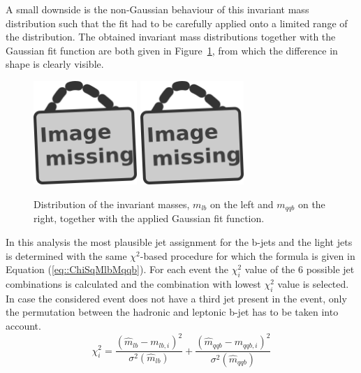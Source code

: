 A small downside is the non-Gaussian behaviour of this invariant mass distribution such that the fit had to be carefully applied onto a limited range of the distribution.
The obtained invariant mass distributions together with the Gaussian fit function are both given in Figure~\ref{fig::InvMasses}, from which the difference in shape is clearly visible.
\\
\begin{figure}[h!t]
 \centering
 \includegraphics[width = 0.35\textwidth]{image.png} %
 \includegraphics[width = 0.35\textwidth]{image.png} %
 \caption{Distribution of the invariant masses, $m_{lb}$ on the left and $m_{qqb}$ on the right, together with the applied Gaussian fit function.} \label{fig::InvMasses}
\end{figure}

In this analysis the most plausible jet assignment for the b-jets and the light jets is determined with the same $\chi^{2}$-based procedure for which the formula is given in Equation (\ref{eq::ChiSqMlbMqqb}).
For each event the $\chi^{2}_{i}$ value of the 6 possible jet combinations is calculated and the combination with lowest $\chi^2_{i}$ value is selected.
In case the considered event does not have a third jet present in the event, only the permutation between the hadronic and leptonic b-jet has to be taken into account.
\begin{equation} \label{eq::ChiSqMlbMqqb}
 \chi^{2}_{i} = \frac{(\hat{m}_{lb} - m_{lb,i})^{2}}{\sigma^{2}(\hat{m}_{lb})} + \frac{(\hat{m}_{qqb} - m_{qqb,i})^{2}}{\sigma^{2}(\hat{m}_{qqb})}
\end{equation}

